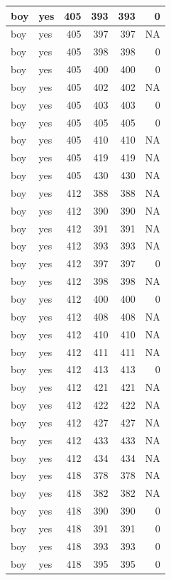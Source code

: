 \documentclass[man]{apa6}
\begin{document}
\begin{tabular}{l|l|r|r|r|r}
\hline
boy & yes & 405 & 393 & 393 & 0\\
\hline
boy & yes & 405 & 397 & 397 & NA\\
\hline
boy & yes & 405 & 398 & 398 & 0\\
\hline
boy & yes & 405 & 400 & 400 & 0\\
\hline
boy & yes & 405 & 402 & 402 & NA\\
\hline
boy & yes & 405 & 403 & 403 & 0\\
\hline
boy & yes & 405 & 405 & 405 & 0\\
\hline
boy & yes & 405 & 410 & 410 & NA\\
\hline
boy & yes & 405 & 419 & 419 & NA\\
\hline
boy & yes & 405 & 430 & 430 & NA\\
\hline
boy & yes & 412 & 388 & 388 & NA\\
\hline
boy & yes & 412 & 390 & 390 & NA\\
\hline
boy & yes & 412 & 391 & 391 & NA\\
\hline
boy & yes & 412 & 393 & 393 & NA\\
\hline
boy & yes & 412 & 397 & 397 & 0\\
\hline
boy & yes & 412 & 398 & 398 & NA\\
\hline
boy & yes & 412 & 400 & 400 & 0\\
\hline
boy & yes & 412 & 408 & 408 & NA\\
\hline
boy & yes & 412 & 410 & 410 & NA\\
\hline
boy & yes & 412 & 411 & 411 & NA\\
\hline
boy & yes & 412 & 413 & 413 & 0\\
\hline
boy & yes & 412 & 421 & 421 & NA\\
\hline
boy & yes & 412 & 422 & 422 & NA\\
\hline
boy & yes & 412 & 427 & 427 & NA\\
\hline
boy & yes & 412 & 433 & 433 & NA\\
\hline
boy & yes & 412 & 434 & 434 & NA\\
\hline
boy & yes & 418 & 378 & 378 & NA\\
\hline
boy & yes & 418 & 382 & 382 & NA\\
\hline
boy & yes & 418 & 390 & 390 & 0\\
\hline
boy & yes & 418 & 391 & 391 & 0\\
\hline
boy & yes & 418 & 393 & 393 & 0\\
\hline
boy & yes & 418 & 395 & 395 & 0\\

\end{tabular}
\end{document}
